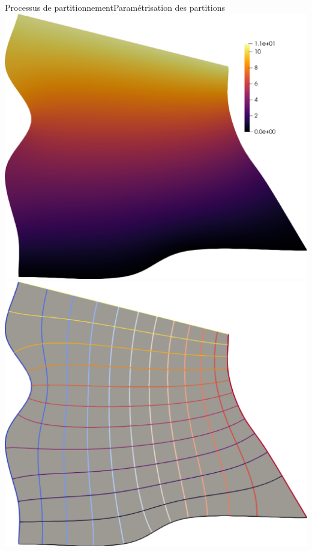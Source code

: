 \documentclass[compress,10pt,aspectratio=169]{beamer}
\begin{document}
\begin{frame}{Processus de partitionnement}{Paramétrisation des partitions}
{\includegraphics[scale=0.1]{images/quad_equation_2.pdf}\hspace{0.2cm}
\includegraphics[scale=0.1]{images/quad_equation_3.pdf}\hspace{0.2cm}
}
\end{frame}
\end{document}
